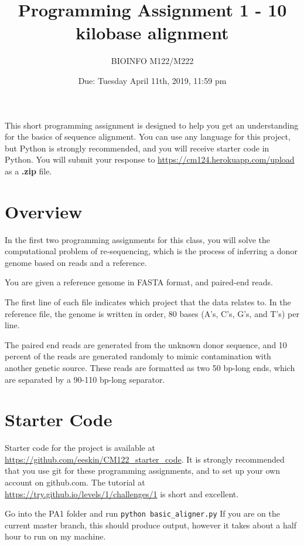 \documentclass{article}
\begin{document}
\title{Programming Assignment 1 - 10 kilobase alignment}

\author{BIOINFO M122/M222}

\date{Due: Tuesday April 11th, 2019, 11:59 pm}

\maketitle

This short programming assignment is designed to help you get an
understanding for the basics of sequence alignment. You can use any language
for this project, but Python is strongly recommended, and you will receive starter code in Python. You will submit your response to \url{https://cm124.herokuapp.com/upload} as a \textbf{.zip} file.

\section*{Overview}
In the first two programming assignments for this class, you will solve the computational problem of re-sequencing, which is the process of inferring a donor genome based on reads and a reference. 

You are given a reference genome in FASTA format, and paired-end reads.

The first line of each file indicates which project that the data relates to. In the reference file, the genome is written in order, 80 bases (A's, C's, G's, and T's) per line.

The paired end reads are generated from the unknown donor sequence, and 10 percent of the reads are generated randomly to mimic contamination with another genetic source. These reads are formatted as two 50 bp-long ends, which are separated by a 90-110 bp-long separator. 

\section*{Starter Code}

Starter code for the project is available at \url{https://github.com/eeskin/CM122_starter_code}. It is strongly recommended that you use git for these programming assignments, and to set up your own account on github.com. The tutorial at \url{https://try.github.io/levels/1/challenges/1} is short and excellent.

Go into the PA1 folder and run \verb!python basic_aligner.py! If you are on the current master branch, this should produce output, however it takes about a half hour to run on my machine.
\end{document}
